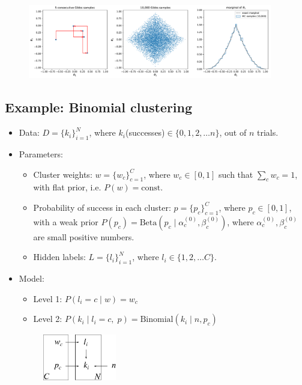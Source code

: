 \begin{figure}[h!]
\centering
	\includegraphics[width=0.95\textwidth]{./figs/08-2d-triangle.pdf}
\end{figure}

\subsection{Example: Binomial clustering}
\begin{itemize}
	\item Data: $D = \{k_i\}_{i=1}^N$, where $k_i$(successes)$ \in \{0, 1, 2, \ldots n\}$, out of $n$ trials.
	\item Parameters:
		\begin{itemize}
			\item Cluster weights: $w = \{w_c\}_{c=1}^C$, where $w_c \in [0,1]$ such that $\sum_c w_c = 1$, with flat prior, i.e. $P(w) = \text{const.}$
			\item Probability of success in each cluster: $p = \{p_c\}_{c=1}^C$, where $p_c \in [0,1]$, with a weak prior $P(p_c) = \text{Beta}(p_c\;|\;\alpha_c^{(0)}, \beta_c^{(0)})$, where $\alpha_c^{(0)}, \beta_c^{(0)}$ are small positive numbers.
			\item Hidden labels: $L = \{l_i\}_{i=1}^N$, where $l_i \in \{1,2,\ldots C\}$.
		\end{itemize}
	\item Model:
		\begin{itemize}
			\item Level 1: $P(l_i = c\;|\;w) = w_c$
			\item Level 2: $P(k_i\;|\; l_i = c,\; p) = \text{Binomial}(k_i\;|\;n, p_c)$
		\end{itemize}
		\begin{figure}[h!]
		\centering
			\includegraphics[height=20mm]{./figs/08-clustering.pdf}
		\end{figure}

\end{itemize}

